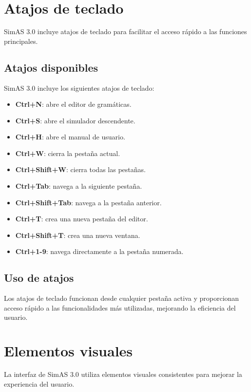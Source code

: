 \section{Atajos de teclado}

SimAS 3.0 incluye atajos de teclado para facilitar el acceso rápido a las funciones principales.

\subsection{Atajos disponibles}

SimAS 3.0 incluye los siguientes atajos de teclado:

\begin{itemize}
    \item \textbf{Ctrl+N}: abre el editor de gramáticas.
    \item \textbf{Ctrl+S}: abre el simulador descendente.
    \item \textbf{Ctrl+H}: abre el manual de usuario.
    \item \textbf{Ctrl+W}: cierra la pestaña actual.
    \item \textbf{Ctrl+Shift+W}: cierra todas las pestañas. 
    \item \textbf{Ctrl+Tab}: navega a la siguiente pestaña.
    \item \textbf{Ctrl+Shift+Tab}: navega a la pestaña anterior.
    \item \textbf{Ctrl+T}: crea una nueva pestaña del editor.
    \item \textbf{Ctrl+Shift+T}: crea una nueva ventana.
    \item \textbf{Ctrl+1-9}: navega directamente a la pestaña numerada.
\end{itemize}

\subsection{Uso de atajos}

Los atajos de teclado funcionan desde cualquier pestaña activa y proporcionan acceso rápido a las funcionalidades más utilizadas, mejorando la eficiencia del usuario.

\section{Elementos visuales}

La interfaz de SimAS 3.0 utiliza elementos visuales consistentes para mejorar la experiencia del usuario.


